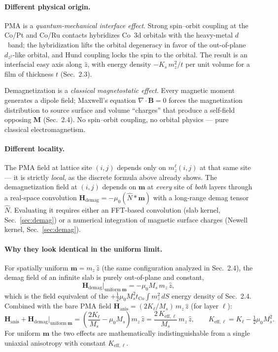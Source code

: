 \documentclass[11pt,a4paper]{article}
\newcommand{\mb}[1]{\mathbf{#1}}
\newcommand{\zhat}{\hat{z}}
\newcommand{\Hanis}{\mb{H}_{\text{anis}}}
\newcommand{\Hdemag}{\mb{H}_{\text{demag}}}
\newcommand{\tCo}{t_{\text{Co}}}
\newcommand{\Ms}{M_s}
\begin{document}
\paragraph{Different physical origin.}
PMA is a \emph{quantum-mechanical interface effect}.  Strong
spin--orbit coupling at the Co/Pt and Co/Ru contacts
hybridizes Co~3d orbitals with the heavy-metal $d$~band; the
hybridization lifts the orbital degeneracy in favor of the
out-of-plane $d_{z^2}$-like orbital, and Hund coupling locks
the spin to the orbital.  The result is an interfacial easy
axis along $\zhat$, with energy density $-K_s\,m_z^2/t$ per
unit volume for a film of thickness $t$ (Sec.~2.3).

Demagnetization is a \emph{classical magnetostatic effect}.
Every magnetic moment generates a dipole field; Maxwell's
equation $\nabla \cdot \mb{B} = 0$ forces the magnetization
distribution to source surface and volume ``charges'' that
produce a self-field opposing $\mb{M}$ (Sec.~2.4).  No
spin--orbit coupling, no orbital physics --- pure classical
electromagnetism.

\paragraph{Different locality.}
The PMA field at lattice site $(i, j)$ depends only on
$m^\ell_z(i, j)$ at that same site --- it is strictly
\emph{local}, as the discrete formula above already shows.
The demagnetization field at $(i, j)$ depends on $\mb{m}$ at
\emph{every} site of \emph{both} layers through a real-space
convolution
$\Hdemag = -\mu_0 (\hat N * \mb{m})$
with a long-range demag tensor $\hat N$.  Evaluating it
requires either an FFT-based convolution (slab kernel,
Sec.~\ref{sec:demag}) or a numerical integration of magnetic
surface charges (Newell kernel, Sec.~\ref{sec:demag}).

\paragraph{Why they look identical in the uniform limit.}
For spatially uniform $\mb{m} = m_z\,\zhat$ (the same
configuration analyzed in Sec.~2.4), the demag field of an
infinite slab is purely out-of-plane and constant,
%
\begin{equation}
\Hdemag\bigl|_{\text{uniform}\ \mb{m}} =
    -\mu_0 \Ms \, m_z\,\zhat ,
\end{equation}
%
which is the field equivalent of the
$+\tfrac{1}{2}\mu_0 \Ms^2 \tCo \int m_z^2\, dS$
energy density of Sec.~2.4.  Combined with the bare PMA
field $\Hanis = (2K_\ell/\Ms)\,m_z\,\zhat$ (for layer
$\ell$):
%
\begin{equation}
\Hanis + \Hdemag\bigl|_{\text{uniform}\ \mb{m}} =
\left(\frac{2K_\ell}{\Ms} - \mu_0 \Ms\right) m_z \,\zhat
= \frac{2\,K_{\text{eff},\ell}}{\Ms}\, m_z \,\zhat,
\qquad
K_{\text{eff},\ell} = K_\ell - \tfrac{1}{2}\mu_0 \Ms^2 .
\label{eq:keff_identity}
\end{equation}
%
For uniform $\mb{m}$ the two effects are mathematically
indistinguishable from a single uniaxial anisotropy with
constant $K_{\text{eff},\ell}$.
\end{document}
